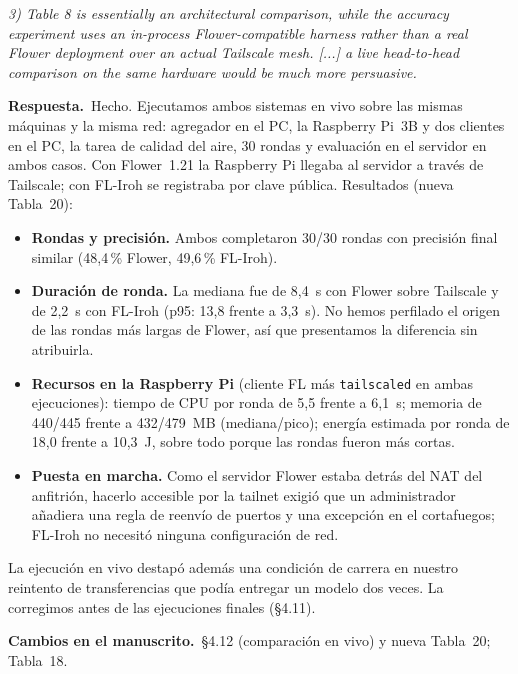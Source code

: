 \documentclass[11pt,a4paper]{article}
\newenvironment{comment}{\par\medskip\noindent\begin{minipage}{\linewidth}\color{blue!45!black}\itshape}{\end{minipage}\par}
\newcommand{\reply}{\par\smallskip\noindent\textbf{Respuesta.}~}
\newcommand{\changes}{\par\smallskip\noindent\textbf{Cambios en el manuscrito.}~}
\begin{document}
\begin{comment}
3) Table 8 is essentially an architectural comparison, while the accuracy experiment uses an in-process Flower-compatible harness rather than a real Flower deployment over an actual Tailscale mesh. [...] a live head-to-head comparison on the same hardware would be much more persuasive.
\end{comment}
\reply Hecho. Ejecutamos ambos sistemas en vivo sobre las mismas máquinas y la misma red: agregador en el PC, la Raspberry Pi~3B y dos clientes en el PC, la tarea de calidad del aire, 30 rondas y evaluación en el servidor en ambos casos. Con Flower~1.21 la Raspberry Pi llegaba al servidor a través de Tailscale; con FL-Iroh se registraba por clave pública. Resultados (nueva Tabla~20):
\begin{itemize}[leftmargin=1.3em,itemsep=0.1em]
\item \textbf{Rondas y precisión.} Ambos completaron 30/30 rondas con precisión final similar (48,4\,\% Flower, 49,6\,\% FL-Iroh).
\item \textbf{Duración de ronda.} La mediana fue de 8,4~s con Flower sobre Tailscale y de 2,2~s con FL-Iroh (p95: 13,8 frente a 3,3~s). No hemos perfilado el origen de las rondas más largas de Flower, así que presentamos la diferencia sin atribuirla.
\item \textbf{Recursos en la Raspberry Pi} (cliente FL más \texttt{tailscaled} en ambas ejecuciones): tiempo de CPU por ronda de 5,5 frente a 6,1~s; memoria de 440/445 frente a 432/479~MB (mediana/pico); energía estimada por ronda de 18,0 frente a 10,3~J, sobre todo porque las rondas fueron más cortas.
\item \textbf{Puesta en marcha.} Como el servidor Flower estaba detrás del NAT del anfitrión, hacerlo accesible por la tailnet exigió que un administrador añadiera una regla de reenvío de puertos y una excepción en el cortafuegos; FL-Iroh no necesitó ninguna configuración de red.
\end{itemize}
La ejecución en vivo destapó además una condición de carrera en nuestro reintento de transferencias que podía entregar un modelo dos veces. La corregimos antes de las ejecuciones finales (\S4.11).

\changes \S4.12 (comparación en vivo) y nueva Tabla~20; Tabla~18.
\end{document}
